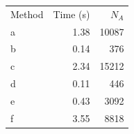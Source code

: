 \begin{tabular}{lrr}
\hline
Method & Time (s) & $N_A$ \\
a & 1.38 & 10087 \\
b & 0.14 & 376 \\
c & 2.34 & 15212 \\
d & 0.11 & 446 \\
e & 0.43 & 3092 \\
f & 3.55 & 8818 \\
\hline
\end{tabular}
